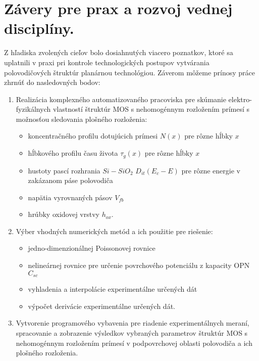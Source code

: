 \chapter{Závery pre prax a rozvoj vednej disciplíny.}\label{Chapter9}

Z hľadiska zvolených cieľov bolo dosiahnutých viacero poznatkov, ktoré
sa uplatnili v praxi pri kontrole technologických postupov vytvárania
polovodičových štruktúr planárnou technológiou. Záverom môžeme prínosy
práce zhrnúť do nasledovných bodov:

\begin{enumerate}

\item Realizácia komplexného automatizovaného pracoviska pre skúmanie
  elektro-fyzikálnych vlastností štruktúr MOS s nehomogénnym
  rozložením prímesí s možnosťou sledovania plošného rozloženia:

  \begin{itemize}
  \item koncentračného profilu dotujúcich prímesi $N(x)$ pre rôzne
    hĺbky $x$
  \item hĺbkového profilu času života $\tau_{g}(x)$ pre rôzne hĺbky
    $x$
  \item hustoty pascí rozhrania $Si-SiO_{2}$ $D_{it}(E_{c}-E)$ pre
    rôzne energie v zakázanom páse polovodiča
  \item napätia vyrovnaných pásov $V_{fb}$
  \item hrúbky oxidovej vrstvy $h_{ox}$.
  \end{itemize}

\item Výber vhodných numerických metód a ich použitie pre riešenie:

  \begin{itemize}
  \item jedno-dimenzionálnej Poissonovej rovnice
  \item nelineárnej rovnice pre určenie povrchového potenciálu z
    kapacity OPN $C_{sc}$
  \item vyhladenia a interpolácie experimentálne určených dát
  \item výpočet derivácie experimentálne určených dát.
  \end{itemize}

\item Vytvorenie programového vybavenia pre riadenie experimentálnych
  meraní, spracovanie a zobrazenie výsledkov vybraných parametrov
  štruktúr MOS s nehomogénnym rozložením prímesí v podpovrchovej
  oblasti polovodiča a ich plošného rozloženia.


\end{enumerate}
